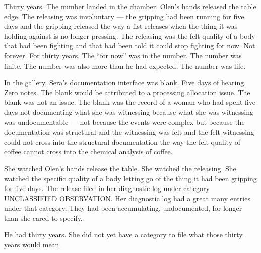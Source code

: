 Thirty years. The number landed in the chamber. Olen's hands released the table edge. The releasing was involuntary — the gripping had been running for five days and the gripping released the way a fist releases when the thing it was holding against is no longer pressing. The releasing was the felt quality of a body that had been fighting and that had been told it could stop fighting for now. Not forever. For thirty years. The \enquote{for now} was in the number. The number was finite. The number was also more than he had expected. The number was life.

In the gallery, Sera's documentation interface was blank. Five days of hearing. Zero notes. The blank would be attributed to a processing allocation issue. The blank was not an issue. The blank was the record of a woman who had spent five days not documenting what she was witnessing because what she was witnessing was undocumentable — not because the events were complex but because the documentation was structural and the witnessing was felt and the felt witnessing could not cross into the structural documentation the way the felt quality of coffee cannot cross into the chemical analysis of coffee.

She watched Olen's hands release the table. She watched the releasing. She watched the specific quality of a body letting go of the thing it had been gripping for five days. The release filed in her diagnostic log under category UNCLASSIFIED OBSERVATION. Her diagnostic log had a great many entries under that category. They had been accumulating, undocumented, for longer than she cared to specify.

\begin{latticelog}
He had thirty years. She did not yet have a category to file what those thirty years would mean.
\end{latticelog}

